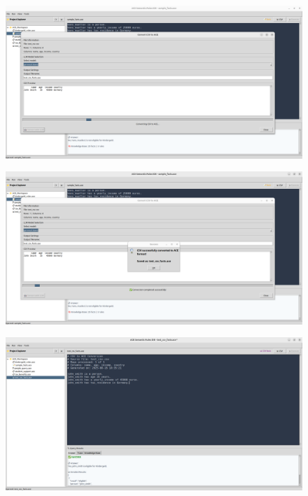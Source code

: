 \documentclass[12pt,a4paper]{article}
\begin{document}
\begin{figure}[h]
    \includegraphics[width=16cm]{ace_code_screenshot_2}
\end{figure}

\begin{figure}[h]
    \includegraphics[width=16cm]{ace_code_screenshot_3}
\end{figure}

\begin{figure}[h]
    \includegraphics[width=16cm]{ace_code_screenshot_4}
\end{figure}
\end{document}
